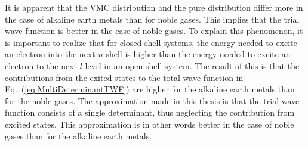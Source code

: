 It is apparent that the VMC distribution and the pure distribution differ more in the case of alkaline earth metals than for noble gases. This implies that the trial wave function is better in the case of noble gases. To explain this phenomenon, it is important to realize that for closed shell systems, the energy needed to excite an electron into the next $n$-shell is higher than the energy needed to excite an electron to the next $l$-level in an open shell system. The result of this is that the contributions from the exited states to the total wave function in Eq.~(\ref{eq:MultiDeterminantTWF}) are higher for the alkaline earth metals than for the noble gases. The approximation made in this thesis is that the trial wave function consists of a single determinant, thus neglecting the contribution from excited states. This approximation is in other words better in the case of noble gases than for the alkaline earth metals.
 
 
 
